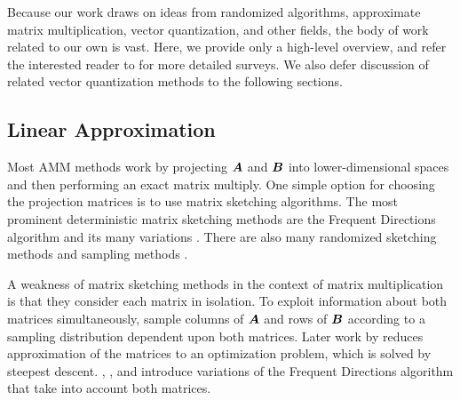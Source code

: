 
Because our work draws on ideas from randomized algorithms, approximate matrix multiplication, vector quantization, and other fields, the body of work related to our own is vast. Here, we provide only a high-level overview, and refer the interested reader to \cite{learningToHashSurvey, hashingSimilaritySurvey, isvd} for more detailed surveys. We also defer discussion of related vector quantization methods to the following sections.

\vspace{-1mm}
\subsection{Linear Approximation}
Most AMM methods work by projecting $\bm{A}$ and $\bm{B}$ into lower-dimensional spaces and then performing an exact matrix multiply.
One simple option for choosing the projection matrices is to use matrix sketching algorithms. The most prominent deterministic matrix sketching methods are the Frequent Directions algorithm \cite{liberty_simple_2012, ghashami_frequent_2016} and its many variations \cite{teng_fast_2019, francis_practical_2018, ye_frequent_2016, huang_near_2019, luo_robust_2019, francis_improvement_2018}. There are also many randomized sketching methods \cite{sarlos_improved_2006, kyrillidis_approximate_2014, pagh_compressed_2013, hashjl,osnap} and sampling methods \cite{drineas_fast_2006-1, drineas_fast_2006-2}.

A weakness of matrix sketching methods in the context of matrix multiplication is that they consider each matrix in isolation. To exploit information about both matrices simultaneously, \citet{drineas_fast_2006} sample columns of $\bm{A}$ and rows of $\bm{B}$ according to a sampling distribution dependent upon both matrices. Later work by \citet{manne_fast_2014} reduces approximation of the matrices to an optimization problem, which is solved by steepest descent. \citet{mroueh_co-occuring_2016}, \citet{ye_frequent_2016}, and \citet{francis_improvement_2018} introduce variations of the Frequent Directions algorithm that take into account both matrices.

